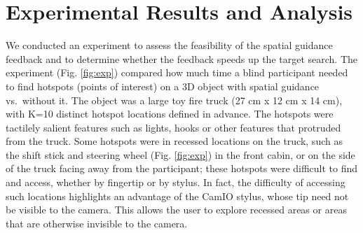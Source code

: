 \documentclass[runningheads]{res/templates/llncs}
\begin{document}
\hypertarget{results}{%
\section{Experimental Results and Analysis}\label{results}}

We conducted an experiment to assess the feasibility of the spatial
guidance feedback and to determine whether the feedback speeds up the
target search. The experiment (Fig. \ref{fig:exp}) compared how much time a
blind participant needed to find hotspots (points of interest) on a 3D
object with spatial guidance vs.~without it. The object was a large toy
fire truck (27 cm x 12 cm x 14 cm), with K=10 distinct hotspot locations
defined in advance. The hotspots were tactilely salient features such as
lights, hooks or other features that protruded from the truck. Some
hotspots were in recessed locations on the truck, such as the shift
stick and steering wheel (Fig. \ref{fig:exp}) in the front cabin, or on the
side of the truck facing away from the participant; these hotspots were
difficult to find and access, whether by fingertip or by stylus. In
fact, the difficulty of accessing such locations highlights an advantage
of the CamIO stylus, whose tip need not be visible to the camera. This
allows the user to explore recessed areas or areas that are otherwise
invisible to the camera.
\end{document}
